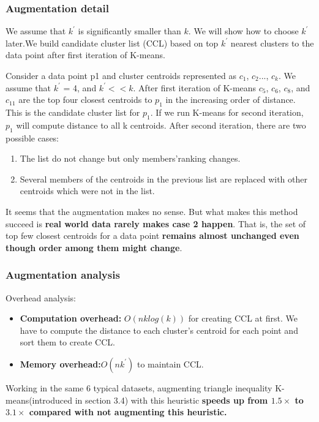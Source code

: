 \documentclass[11pt]{article}
\begin{document}
\subsubsection{Augmentation detail}
\par We assume that $k^{\prime}$ is significantly smaller than $k$. We will show how to choose $k^{\prime}$ later.We build candidate cluster list (CCL) based on top $k^{\prime}$ nearest clusters to the data point after first iteration of K-means. \par

Consider a data point p1 and cluster centroids represented as $c_1$, $c_2$..., $c_k$. We assume that $k^{\prime}$ = 4, and $k^{\prime} << k $. After first iteration of K-means $c_5$, $c_6$, $c_8$, and $c_{11}$ are the top four closest centroids to $p_1$ in the increasing order of distance. This is the candidate cluster list for $p_1$. If we run K-means for second iteration, $p_1$ will compute distance to all k centroids. After second iteration, there are two possible cases:
\begin{enumerate}
\item The list do not change but only members'ranking changes.
\item Several members of the centroids in the previous list are replaced with other centroids which were not in the list.
\end{enumerate}
It seems that the augmentation makes no sense. But what makes this method succeed is \textbf{real world data rarely makes case 2 happen}. That is, the set of top few closest centroids for a data point \textbf{remains almost unchanged even though order among them might change}.
\subsubsection{Augmentation analysis}
Overhead analysis:
\begin{itemize}
\item \textbf{Computation overhead:} $O(nklog(k))$ for creating CCL at first. We have to compute the distance to each cluster's centroid for each point and sort them to create CCL. 
\item \textbf{Memory overhead:}$ O(nk^{\prime})$ to maintain CCL.
\end{itemize}

\par
Working in the same 6 typical datasets, augmenting triangle inequality K-means(introduced in section 3.4) with this heuristic \textbf{speeds up from $ 1.5 \times$ to $  3.1 \times$ compared with not augmenting this heuristic.}
\end{document}

